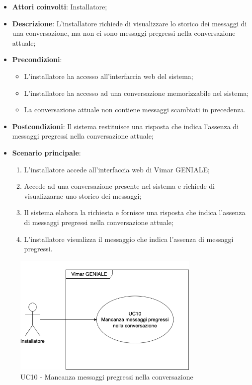 \begin{itemize}
    \item \textbf{Attori coinvolti}: Installatore;
    \item \textbf{Descrizione}: L’installatore richiede di visualizzare lo storico dei messaggi di una conversazione, ma non ci sono messaggi pregressi nella conversazione attuale;
    \item \textbf{Precondizioni}: 
        \begin{itemize}
            \item L’installatore ha accesso all’interfaccia web del sistema;
            \item L’installatore ha accesso ad una conversazione memorizzabile nel sistema;
            \item La conversazione attuale non contiene messaggi scambiati in precedenza.
        \end{itemize}
    \item \textbf{Postcondizioni}: Il sistema restituisce una risposta che indica l’assenza di messaggi pregressi nella conversazione attuale;
    \item \textbf{Scenario principale}:
    \begin{enumerate}
    \item L’installatore accede all’interfaccia web di Vimar GENIALE;
    \item Accede ad una conversazione presente nel sistema e richiede di visualizzarne uno storico dei messaggi;
    \item Il sistema elabora la richiesta e fornisce una risposta che indica l’assenza di messaggi pregressi nella conversazione attuale;
    \item L’installatore visualizza il messaggio che indica l’assenza di messaggi pregressi.
    \end{enumerate}
\end{itemize}
\begin{figure}[H]
\centering
\includegraphics[width=0.8\textwidth]{contents/casi_duso/png/UC10.png}
\caption{UC10 - Mancanza messaggi pregressi nella conversazione}
\end{figure}


